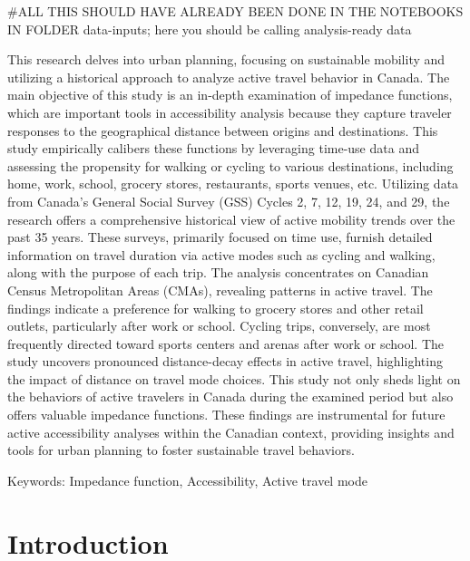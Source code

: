 \documentclass[
11pt, %
oneside, %
english, %
singlespacing, %
]{macthesis} %
\begin{document}
\#ALL THIS SHOULD HAVE ALREADY BEEN DONE IN THE NOTEBOOKS IN FOLDER data-inputs; here you should be calling analysis-ready data

This research delves into urban planning, focusing on sustainable mobility and utilizing a historical approach to analyze active travel behavior in Canada. The main objective of this study is an in-depth examination of impedance functions, which are important tools in accessibility analysis because they capture traveler responses to the geographical distance between origins and destinations. This study empirically calibers these functions by leveraging time-use data and assessing the propensity for walking or cycling to various destinations, including home, work, school, grocery stores, restaurants, sports venues, etc. Utilizing data from Canada's General Social Survey (GSS) Cycles 2, 7, 12, 19, 24, and 29, the research offers a comprehensive historical view of active mobility trends over the past 35 years. These surveys, primarily focused on time use, furnish detailed information on travel duration via active modes such as cycling and walking, along with the purpose of each trip. The analysis concentrates on Canadian Census Metropolitan Areas (CMAs), revealing patterns in active travel. The findings indicate a preference for walking to grocery stores and other retail outlets, particularly after work or school. Cycling trips, conversely, are most frequently directed toward sports centers and arenas after work or school. The study uncovers pronounced distance-decay effects in active travel, highlighting the impact of distance on travel mode choices. This study not only sheds light on the behaviors of active travelers in Canada during the examined period but also offers valuable impedance functions. These findings are instrumental for future active accessibility analyses within the Canadian context, providing insights and tools for urban planning to foster sustainable travel behaviors.

Keywords: Impedance function, Accessibility, Active travel mode

\hypertarget{introduction-2}{%
\section{Introduction}\label{introduction-2}}
\end{document}
